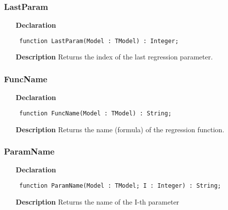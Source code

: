 \documentclass[12pt,a4paper,oneside]{report}
\newcommand{\declarationitem}[1]{\textbf{#1}}
\newcommand{\descriptiontitle}[1]{\textbf{#1}}
\newcommand{\code}[1]{\texttt{#1}}
\begin{document}
\subsubsection{LastParam}
\label{umodels-LastParam}
\begin{itemize}\item[\declarationitem{Declaration}\hfill]
	\begin{flushleft}
		\code{
			function LastParam(Model : TModel) : Integer;}
		
	\end{flushleft}
	
	\par
	\item[\descriptiontitle{Description}]
	Returns the index of the last regression parameter. 	
\end{itemize}
\subsubsection{FuncName}
\label{umodels-FuncName}
\begin{itemize}\item[\declarationitem{Declaration}\hfill]
	\begin{flushleft}
		\code{
			function FuncName(Model : TModel) : String;}
		
	\end{flushleft}
	
	\par
	\item[\descriptiontitle{Description}]
	Returns the name (formula) of the regression function. 	
\end{itemize}
\subsubsection{ParamName}
\label{umodels-ParamName}
\begin{itemize}\item[\declarationitem{Declaration}\hfill]
	\begin{flushleft}
		\code{
			function ParamName(Model : TModel; I : Integer) : String;}
		
	\end{flushleft}
	
	\par
	\item[\descriptiontitle{Description}]
	Returns the name of the I{-}th parameter 	
\end{itemize}
\end{document}
